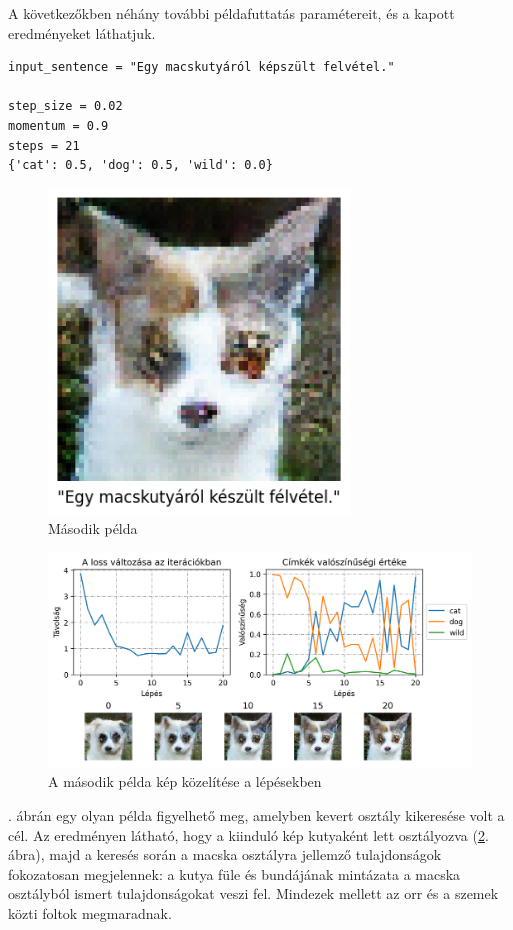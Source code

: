 A következőkben néhány további példafuttatás paramétereit, és a kapott eredményeket láthatjuk.


\begin{verbatim}
input_sentence = "Egy macskutyáról képszült felvétel."

step_size = 0.02
momentum = 0.9
steps = 21
{'cat': 0.5, 'dog': 0.5, 'wild': 0.0}
\end{verbatim}

\begin{figure}[h!]
	\centering
	\includegraphics[width=8cm]{images/demo02.png}
	\caption{Második példa}
	\label{fig:demo2}
\end{figure}

\begin{figure}[h!]
	\centering
	\includegraphics[width=\textwidth]{images/demo02_conv.png}
	\caption{A második példa kép közelítése a lépésekben}
	\label{fig:demo2_convergence}
\end{figure}

. ábrán egy olyan példa figyelhető meg, amelyben kevert osztály kikeresése volt a cél. Az eredményen látható, hogy a kiinduló kép kutyaként lett osztályozva (\ref{fig:demo2_convergence}. ábra), majd a keresés során a macska osztályra jellemző tulajdonságok fokozatosan megjelennek: a kutya füle és bundájának mintázata a macska osztályból ismert tulajdonságokat veszi fel. Mindezek mellett az orr és a szemek közti foltok megmaradnak.

